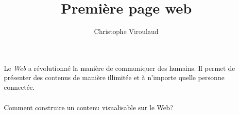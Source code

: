 \documentclass[svgnames,11pt]{beamer}
\author[]{Christophe Viroulaud}
\title{Première page web}
\date{\framebox{\textbf{Web 01}}}
\institute{Seconde - SNT}
\begin{document}
\begin{frame}
    \titlepage
\end{frame}
\begin{frame}
    \frametitle{}

    \begin{center}
        Le \emph{Web} a révolutionné la manière de communiquer des humains. Il permet de présenter des contenus de manière illimitée et à n'importe quelle personne connectée.
    \end{center}

\end{frame}
\begin{frame}
    \frametitle{}

    \begin{framed}
        \centering Comment construire un contenu visualisable sur le Web?
    \end{framed}

\end{frame}
\end{document}
